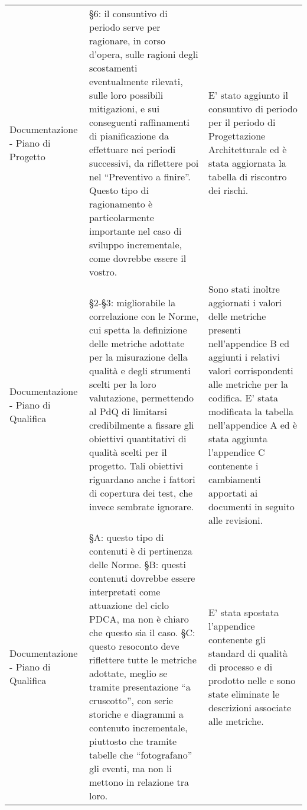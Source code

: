\begin{longtable}{ 
				>{\centering}p{} 
				>{\centering}p{}
				>{\centering\arraybackslash}p{}}
				Documentazione - Piano di Progetto
					&
				 §6: il consuntivo di periodo serve per ragionare, in corso d'opera, sulle ragioni degli scostamenti eventualmente rilevati, sulle loro possibili mitigazioni, e sui conseguenti raffinamenti di pianificazione da  effettuare nei periodi successivi, da riflettere poi nel “Preventivo a finire”. Questo tipo di ragionamento è particolarmente importante nel caso di sviluppo incrementale, come dovrebbe essere il vostro.
					&
				E' stato aggiunto il consuntivo di periodo per il periodo di Progettazione Architetturale ed è stata aggiornata la tabella di riscontro dei rischi.
					\\
		 
				 Documentazione - Piano di Qualifica
					&
				§2-§3: migliorabile la correlazione con le Norme, cui spetta la definizione delle metriche adottate per la misurazione della qualità e degli strumenti scelti per la loro valutazione, permettendo al PdQ di limitarsi credibilmente a fissare gli obiettivi quantitativi di qualità scelti per il progetto. Tali obiettivi riguardano anche i fattori di copertura dei test, che invece sembrate ignorare.
					&
				Sono stati inoltre aggiornati i valori delle metriche presenti nell'appendice B ed aggiunti i relativi valori corrispondenti alle metriche per la codifica. E' stata modificata la tabella nell'appendice A ed è stata aggiunta l'appendice C contenente i cambiamenti apportati ai documenti in seguito alle revisioni.
					\\
			
				Documentazione - Piano di Qualifica
					&
				§A: questo tipo di contenuti è di pertinenza delle Norme. §B: questi contenuti dovrebbe essere interpretati come attuazione del ciclo PDCA\ped{\textit{G}}, ma non è chiaro che questo sia il caso. §C: questo resoconto deve riflettere tutte le metriche adottate, meglio se tramite presentazione “a cruscotto”, con serie storiche e diagrammi a contenuto incrementale, piuttosto che tramite tabelle che “fotografano” gli eventi\ped{\textit{G}}, ma non li mettono in relazione tra loro.
					&
				E' stata spostata l'appendice contenente gli standard di qualità di processo e di prodotto\ped{\textit{G}} nelle \NdP{} e sono state eliminate le descrizioni associate alle metriche.
					\\

			\end{longtable}
		

